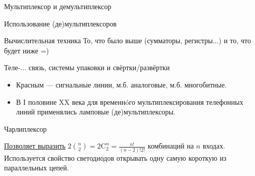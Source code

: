 \documentclass[xetex,aspectratio=43]{beamer}
\begin{document}
\begin{frame}{Мультиплексор и демультиплексор}
    \begin{figure}
        
    \end{figure}
\end{frame}

\begin{frame}{Использование (де)мультиплексоров}

    \begin{block}{Вычислительная техника}
        То, что было выше (сумматоры, регистры...) и то, что будет ниже =)
    \end{block}

    \begin{block}{Теле-\(\ldots\) связь, системы упаковки и свёртки/развёртки}
        \begin{itemize}
            \item
            Красным --- сигнальные линии, м.б. аналоговые, м.б. многобитные.
            \item
            В I половине XX века для временнóго мультиплексирования телефонных
            линий применялись ламповые (де)мультиплексоры.
        \end{itemize}

    \end{block}
\end{frame}

\begin{frame}{Чарлиплексор}
    \begin{figure}
        
    \end{figure}

    \href{http://en.wikipedia.org/wiki/Charlieplexing}{Позволяет выразить} \(2{\binom n 2} = 2 \mathrm{C}^n_2 = \frac{n!}{(n-2)!2!}\) комбинаций на
    \(n\) входах. Используется свойство светодиодов открывать одну самую
    короткую из параллельных цепей.
\end{frame}


\section*{}
\end{document}
